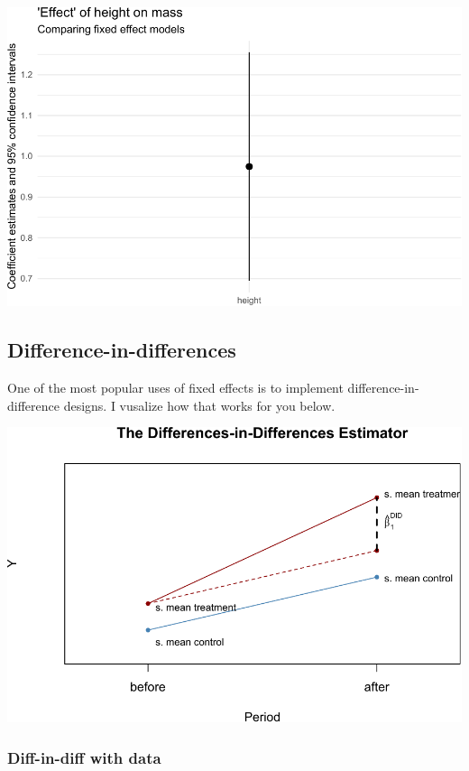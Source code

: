 \documentclass[
]{article}
\begin{document}
\includegraphics{11-panel-twfe_files/figure-latex/modplot-1.pdf}

\hypertarget{difference-in-differences}{%
\subsection{Difference-in-differences}\label{difference-in-differences}}

One of the most popular uses of fixed effects is to implement
difference-in-difference designs. I vusalize how that works for you
below.

\includegraphics{11-panel-twfe_files/figure-latex/did-1.pdf}

\hypertarget{diff-in-diff-with-data}{%
\subsubsection{Diff-in-diff with data}\label{diff-in-diff-with-data}}
\end{document}
